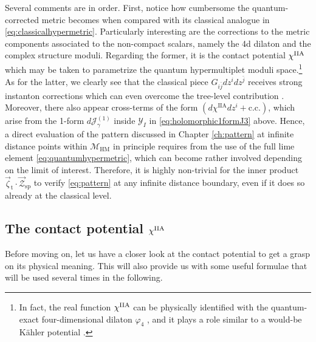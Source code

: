 Several comments are in order. First, notice how cumbersome the quantum-corrected metric becomes when compared with its classical analogue in \eqref{eq:classicalhypermetric}. %
Particularly interesting are the corrections to the metric components associated to the non-compact scalars, namely the 4d dilaton and the complex structure moduli. Regarding the former, it is the contact potential $\chi^{\rm IIA}$ which may be taken to parametrize the quantum hypermultiplet moduli space.\footnote{In fact, the real function $\chi^{\rm IIA}$ can be physically identified with the quantum-exact four-dimensional dilaton $\varphi_4$ \cite{deWit:2006gn}, and it plays a role similar to a would-be K\"ahler potential \cite{deWit:1999fp,deWit:2001brd}.} As for the latter, we clearly see that the classical piece $G_{i \bar j} d z^i d z^{\bar j}$ receives strong instanton corrections which can even overcome the tree-level contribution \cite{Marchesano:2019ifh}. Moreover, there also appear cross-terms of the form $(d \chi^{\text{IIA}} d z^i + \text{c.c.})$, which arise from the 1-form $d \mathcal{J}_{\gamma}^{(1)}$ inside $\mathcal{Y}_I$ in \eqref{eq:holomorphic1formJ3} above. Hence, a direct evaluation of the pattern discussed in Chapter \ref{ch:pattern} at infinite distance points within $\mathcal{M}_{\text{HM}}$ in principle requires from the use of the full lime element \eqref{eq:quantumhypermetric}, which can become rather involved depending on the limit of interest. Therefore, it is highly non-trivial for the inner product $\vec{\zeta}_{\text{t}} \cdot \vec{\mathcal{Z}}_{\text{sp}}$ to verify \eqref{eq:pattern} at any infinite distance boundary, even if it does so already at the classical level.
	
\subsection{The contact potential $\chi^{\rm IIA}$}
\label{sss:chiIIA}
	
Before moving on, let us have a closer look at the contact potential to get a grasp on its physical meaning. This will also provide us with some useful formulae that will be used several times in the following.
	
